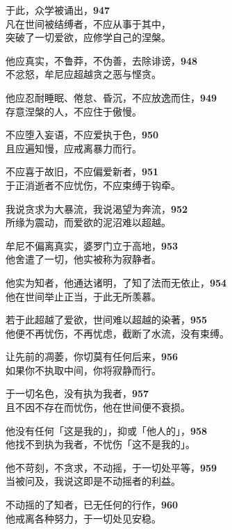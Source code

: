 于此，众学被诵出，\hfill{\grayfootnotesize \textbf{947}} \\
凡在世间被结缚者，不应从事于其中，\\
突破了一切爱欲，应修学自己的涅槃。


他应真实，不鲁莽，不伪善，去除诽谤，\hfill{\grayfootnotesize \textbf{948}} \\
不忿怒，牟尼应超越贪之恶与悭贪。


他应忍耐睡眠、倦怠、昏沉，不应放逸而住，\hfill{\grayfootnotesize \textbf{949}} \\
存意涅槃的人，不应住于傲慢。


不应堕入妄语，不应爱执于色，\hfill{\grayfootnotesize \textbf{950}} \\
且应遍知慢，应戒离暴力而行。


不应喜于故旧，不应偏爱新者，\hfill{\grayfootnotesize \textbf{951}} \\
于正消逝者不应忧伤，不应束缚于钩牵。


我说贪求为大暴流，我说渴望为奔流，\hfill{\grayfootnotesize \textbf{952}} \\
所缘为震动，而爱欲的泥沼难以超越。


牟尼不偏离真实，婆罗门立于高地，\hfill{\grayfootnotesize \textbf{953}} \\
他舍遣了一切，他实被称为寂静者。


他实为知者，他通达诸明，了知了法而无依止，\hfill{\grayfootnotesize \textbf{954}} \\
他在世间举止正当，于此无所羡慕。


若于此超越了爱欲，世间难以超越的染著，\hfill{\grayfootnotesize \textbf{955}} \\
他便不再忧伤，不再忧虑，截断了水流，没有束缚。


让先前的凋萎，你切莫有任何后来，\hfill{\grayfootnotesize \textbf{956}} \\
如果你不执取中间，你将寂静而行。


于一切名色，没有执为我者，\hfill{\grayfootnotesize \textbf{957}} \\
且不因不存在而忧伤，他在世间便不衰损。


他没有任何「这是我的」，抑或「他人的」，\hfill{\grayfootnotesize \textbf{958}} \\
他找不到执为我者，不忧伤「这不是我的」。


他不苛刻，不贪求，不动摇，于一切处平等，\hfill{\grayfootnotesize \textbf{959}} \\
当被问及，我说这即是不动摇者的利益。


不动摇的了知者，已无任何的行作，\hfill{\grayfootnotesize \textbf{960}} \\
他戒离各种努力，于一切处见安稳。



